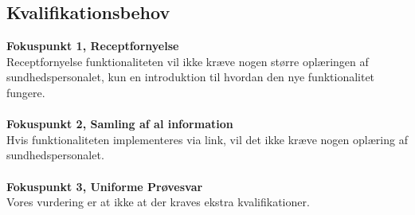 \subsection{Kvalifikationsbehov}
\textbf{Fokuspunkt 1, Receptfornyelse} \\
  Receptfornyelse funktionaliteten vil ikke kræve nogen større oplæringen af sundhedspersonalet, kun en introduktion til hvordan den nye funktionalitet fungere.
  \\\\
  \textbf{Fokuspunkt 2, Samling af al information} \\
  Hvis funktionaliteten implementeres via link, vil det ikke kræve nogen oplæring af sundhedspersonalet.
  \\\\
  \textbf{Fokuspunkt 3, Uniforme Prøvesvar} \\
  Vores vurdering er at ikke at der kraves ekstra kvalifikationer.